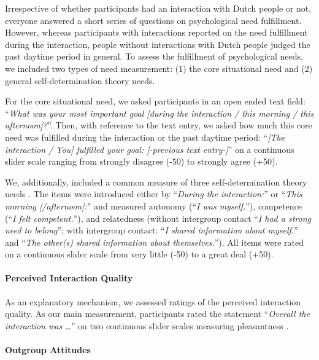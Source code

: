 Irrespective of whether participants had an interaction with Dutch
people or not, everyone answered a short series of questions on
psychological need fulfillment. However, whereas participants with
interactions reported on the need fulfillment during the interaction,
people without interactions with Dutch people judged the past daytime
period in general. To assess the fulfillment of psychological needs, we
included two types of need measurement: (1) the core situational need
and (2) general self-determination theory needs.

For the core situational need, we asked participants in an open ended
text field:
``\textit{What was your most important goal [during the interaction / this morning / this afternoon]?}''.
Then, with reference to the text entry, we asked how much this core need
was fulfilled during the interaction or the past daytime period:
``\textit{[The interaction / You] fulfilled your goal: [-previous text entry-]}''
on a continuous slider scale ranging from strongly disagree (-50) to
strongly agree (+50).

We, additionally, included a common measure of three self-determination
theory needs \citep[see][]{Downie2008}. The items were introduced either
by ``\textit{During the interaction:}'' or
``\textit{This morning [/afternoon]:}'' and measured autonomy
(``\textit{I was myself.}''), competence
(``\textit{I felt competent.}''), and relatedness (without intergroup
contact ``\textit{I had a strong need to belong}''; with intergroup
contact: ``\textit{I shared information about myself.}'' and
``\textit{The other(s) shared information about themselves.}''). All
items were rated on a continuous slider scale from very little (-50) to
a great deal (+50).

\paragraph{Perceived Interaction Quality}

As an explanatory mechanism, we assessed ratings of the perceived
interaction quality. As our main measurement, participants rated the
statement ``\textit{Overall the interaction was …}'' on two continuous
slider scales measuring pleasantness
\citep[from unpleasant (-50) to pleasant (+50)) and meaningfulness (from superficial (-50) to meaningful (+50); both items adapted from][]{Downie2008}.

\paragraph{Outgroup Attitudes}

